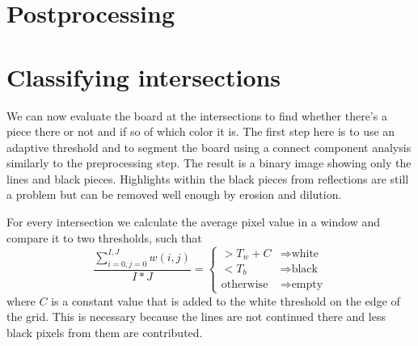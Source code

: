 	\section{Postprocessing}
	\label{detector-postprocessing}

	\section{Classifying intersections}
	\label{detector-classifying}
	We can now evaluate the board at the intersections to find whether there's a piece there or not and if so of which color it is. The first step here is to use an adaptive threshold and to segment the board using a connect component analysis similarly to the preprocessing step. The result is a binary image showing only the lines and black pieces. Highlights within the black pieces from reflections are still a problem but can be removed well enough by erosion and dilution.

	For every intersection we calculate the average pixel value in a window and compare it to two thresholds, such that \begin{equation}
		\frac{\sum^{I,J}_{i=0,j=0}w(i,j)}{I*J} =
		\begin{cases}
		> T_{w} + C & \Rightarrow  \text{white}\\
		< T_{b} & \Rightarrow \text{black}\\
		\text{otherwise} & \Rightarrow \text{empty}
		\end{cases}
	\end{equation}
	where $C$ is a constant value that is added to the white threshold on the edge of the grid. This is necessary because the lines are not continued there and less black pixels from them are contributed.


